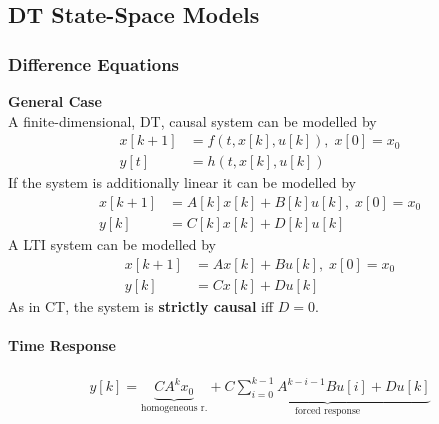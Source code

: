 \subsection{DT State-Space Models}
\subsubsection{Difference Equations}
\textbf{General Case}\\
A finite-dimensional, DT, causal system can be modelled by
\noindent\begin{align*}
    x[k+1] & =f(t,x[k],u[k]), \; x[0]=x_0 \\
    y[t]   & =h(t,x[k],u[k])
\end{align*}
If the system is additionally linear it can be modelled by
\noindent\begin{align*}
    x[k+1] & =A[k]x[k]+B[k]u[k], \; x[0]=x_0 \\
    y[k]   & =C[k]x[k]+D[k]u[k]
\end{align*}
A LTI system can be modelled by
\noindent\begin{align*}
    x[k+1] & =Ax[k]+Bu[k], \; x[0]=x_0 \\
    y[k]   & =Cx[k]+Du[k]
\end{align*}
As in CT, the system is \textbf{strictly causal} iff $D=0$.
\paragraph{Time Response}
\noindent\begin{align*}
    y[k]=\underbrace{CA^kx_0}_{\text{homogeneous r.}} + \underbrace{C\sum_{i=0}^{k-1}A^{k-i-1}Bu[i]+Du[k]}_{\text{forced response}}
\end{align*}
